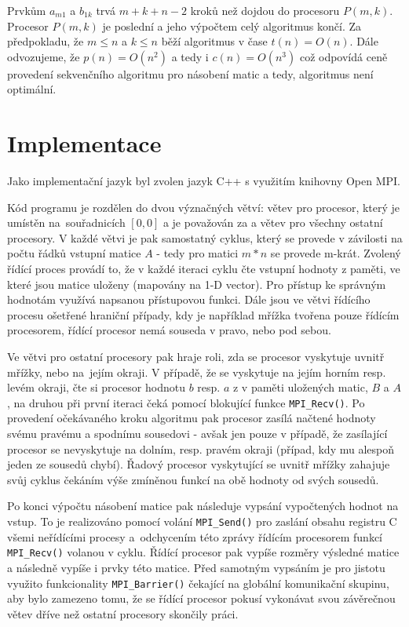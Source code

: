 \documentclass[a4paper,10pt]{article}
\newcommand{\Omicron}{O}
\begin{document}
	\par Prvkům $a_{m1}$ a $b_{1k}$ trvá $m+k+n-2$ kroků než dojdou do procesoru $P(m,k)$. Procesor $P(m,k)$ je poslední a jeho výpočtem celý algoritmus končí. Za předpokladu, že $m \leq n$ a $k\leq n$ běží algoritmus v čase $t\left(n\right) = \Omicron\left(n\right)$. Dále odvozujeme, že $p\left(n\right) = \Omicron\left(n^2\right)$ a tedy i $c\left(n\right) = \Omicron\left(n^3\right)$ což odpovídá ceně provedení sekvenčního algoritmu pro násobení matic a tedy, algoritmus není optimální.

	
	\section{Implementace}
	\label{sec:implementace}
    	\par Jako implementační jazyk byl zvolen jazyk C++ s využitím knihovny Open MPI. 

    	\par Kód programu je rozdělen do dvou význačných větví: větev pro procesor, který je umístěn na~souřadnicích $[0,0]$ a je považován za  a větev pro všechny ostatní procesory. V každé větvi je pak samostatný cyklus, který se provede v závilosti na počtu řádků vstupní matice $A$ \-- tedy pro matici $m*n$ se provede m-krát. Zvolený řídící proces provádí to, že v každé iteraci cyklu čte vstupní hodnoty z paměti, ve které jsou matice uloženy (mapovány na 1-D vector). Pro přístup ke správným hodnotám využívá napsanou přístupovou funkci. Dále jsou ve větvi řídícího procesu ošetřené hraniční případy, kdy je například mřížka tvořena pouze řídícím procesorem, řídící procesor nemá souseda v pravo, nebo pod sebou. 

    	\par Ve větvi pro ostatní procesory pak hraje roli, zda se procesor vyskytuje uvnitř mřížky, nebo na~jejím okraji. V případě, že se vyskytuje na jejím horním resp. levém okraji, čte si procesor hodnotu $b$ resp. $a$ z v paměti uložených matic, $B$ a $A$, na druhou při první iteraci čeká pomocí blokující funkce \texttt{MPI\_Recv()}. Po provedení očekávaného kroku algoritmu pak procesor zasílá načtené hodnoty svému pravému a spodnímu sousedovi \-- avšak jen pouze v případě, že zasílající procesor se nevyskytuje na dolním, resp. pravém okraji (případ, kdy mu alespoň jeden ze sousedů chybí). Řadový procesor vyskytující se uvnitř mřížky zahajuje svůj cyklus čekáním výše zmíněnou funkcí na obě hodnoty od svých sousedů.

    	\par Po konci výpočtu násobení matice pak následuje vypsání vypočtených hodnot na vstup. To je realizováno pomocí volání \texttt{MPI\_Send()} pro zaslání obsahu registru C všemi neřídícími procesy a~odchycením této zprávy řídícím procesorem funkcí \texttt{MPI\_Recv()} volanou v cyklu. Řídící procesor pak vypíše rozměry výsledné matice a následně vypíše i prvky této matice. Před samotným vypsáním je pro jistotu využito funkcionality \texttt{MPI\_Barrier()} čekající na globální komunikační skupinu, aby bylo zamezeno tomu, že se řídící procesor pokusí vykonávat svou závěrečnou větev dříve než ostatní procesory skončily práci. 
\end{document}
